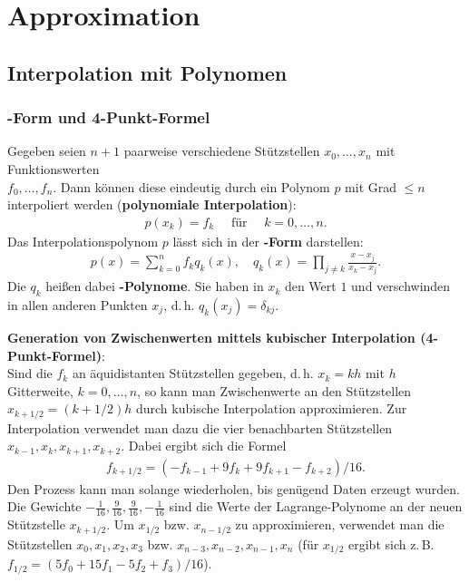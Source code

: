 \section{%
    Approximation%
}

\subsection{%
    Interpolation mit Polynomen%
}

\subsubsection{%
    -Form und 4-Punkt-Formel%
}

Gegeben seien $n + 1$ paarweise verschiedene Stützstellen $x_0, \dotsc, x_n$
mit Funktionswerten \\
$f_0, \dotsc, f_n$.
Dann können diese eindeutig durch ein Polynom $p$ mit Grad $\le n$ interpoliert
werden
(\textbf{polynomiale Interpolation}):
\begin{align*}
    p(x_k) = f_k \quad\text{ für }\quad k = 0, \dotsc, n.
\end{align*}
Das Interpolationspolynom $p$ lässt sich in der \textbf{-Form}
darstellen:
\begin{align*}
    p(x) = \sum_{k=0}^n f_k q_k(x), \quad
    q_k(x) = \prod_{j \not= k} \frac{x - x_j}{x_k - x_j}.
\end{align*}
Die $q_k$ heißen dabei \textbf{-Polynome}.
Sie haben in $x_k$ den Wert $1$ und verschwinden in allen anderen Punkten
$x_j$, d.\,h. $q_k(x_j) = \delta_{kj}$.

\linie

\textbf{Generation von Zwischenwerten mittels kubischer Interpolation
(4-Punkt-Formel)}: \\
Sind die $f_k$ an äquidistanten Stützstellen gegeben, d.\,h.
$x_k = kh$ mit $h$ Gitterweite, $k = 0, \dotsc, n$, so kann man
Zwischenwerte an den Stützstellen $x_{k + 1/2} = (k + 1/2)h$ durch kubische
Interpolation approximieren.
Zur Interpolation verwendet man dazu die vier benachbarten Stützstellen
$x_{k-1}, x_k, x_{k+1}, x_{k+2}$.
Dabei ergibt sich die Formel
\begin{align*}
    f_{k + 1/2} = (-f_{k-1} + 9f_k + 9f_{k+1} - f_{k+2}) / 16.
\end{align*}
Den Prozess kann man solange wiederholen, bis genügend Daten erzeugt wurden.
Die Gewichte $-\frac{1}{16}, \frac{9}{16}, \frac{9}{16}, -\frac{1}{16}$ sind
die Werte der Lagrange-Polynome an der neuen Stützstelle $x_{k + 1/2}$.
Um $x_{1/2}$ bzw. $x_{n - 1/2}$ zu approximieren, verwendet man die
Stützstellen $x_0, x_1, x_2, x_3$ bzw. $x_{n-3}, x_{n-2}, x_{n-1}, x_n$
(für $x_{1/2}$ ergibt sich z.\,B. $f_{1/2} = (5f_0 + 15f_1- 5f_2 + f_3) / 16$).

